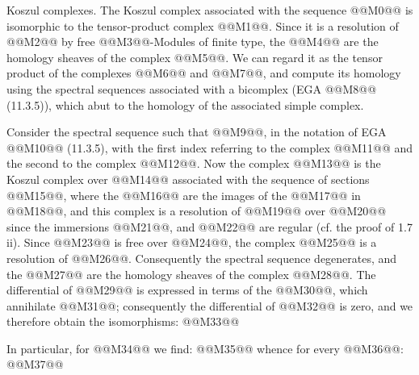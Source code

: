Koszul complexes. The Koszul complex associated with the sequence @@M0@@ is isomorphic to the tensor-product complex @@M1@@. Since it is a resolution of @@M2@@ by free @@M3@@-Modules of finite type, the @@M4@@ are the homology sheaves of the complex @@M5@@. We can regard it as the tensor product of the complexes @@M6@@ and @@M7@@, and compute its homology using the spectral sequences associated with a bicomplex (EGA @@M8@@ (11.3.5)), which abut to the homology of the associated simple complex.

Consider the spectral sequence such that @@M9@@, in the notation of EGA @@M10@@ (11.3.5), with the first index referring to the complex @@M11@@ and the second to the complex @@M12@@. Now the complex @@M13@@ is the Koszul complex over @@M14@@ associated with the sequence of sections @@M15@@, where the @@M16@@ are the images of the @@M17@@ in @@M18@@, and this complex is a resolution of @@M19@@ over @@M20@@ since the immersions @@M21@@, and @@M22@@ are regular (cf. the proof of 1.7 ii). Since @@M23@@ is free over @@M24@@, the complex @@M25@@ is a resolution of @@M26@@. Consequently the spectral sequence degenerates, and the @@M27@@ are the homology sheaves of the complex @@M28@@. The differential of @@M29@@ is expressed in terms of the @@M30@@, which annihilate @@M31@@; consequently the differential of @@M32@@ is zero, and we therefore obtain the isomorphisms:
@@M33@@

In particular, for @@M34@@ we find:
@@M35@@
whence for every @@M36@@:
@@M37@@
